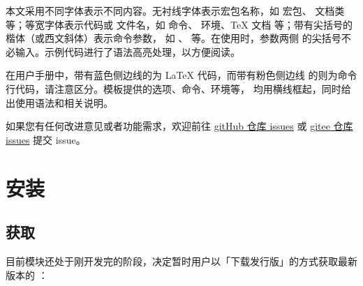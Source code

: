 \documentclass{ccnudoc}
\begin{document}
本文采用不同字体表示不同内容。无衬线字体表示宏包名称，如
 宏包、 文档类等；等宽字体表示代码或
文件名，如  命令、 环境、\TeX{} 文档
 等；带有尖括号的楷体（或西文斜体）表示命令参数，
如 、 等。在使用时，参数两侧
的尖括号不必输入。示例代码进行了语法高亮处理，以方便阅读。

在用户手册中，带有蓝色侧边线的为 \LaTeX{} 代码，而带有粉色侧边线
的则为命令行代码，请注意区分。模板提供的选项、命令、环境等，
均用横线框起，同时给出使用语法和相关说明。


如果您有任何改进意见或者功能需求，欢迎前往 \href{https://github.com/xkwxdyy/CCNUthesis/issues}{gitHub 仓库 issues} 或 \href{https://gitee.com/xkwxdyy/CCNUthesis/issues}{gitee 仓库 issues} 提交 issue。



\section{安装}

\subsection{获取 }

目前模块还处于刚开发完的阶段，决定暂时用户以「下载发行版」的方式获取最新版本的 ：
\end{document}
